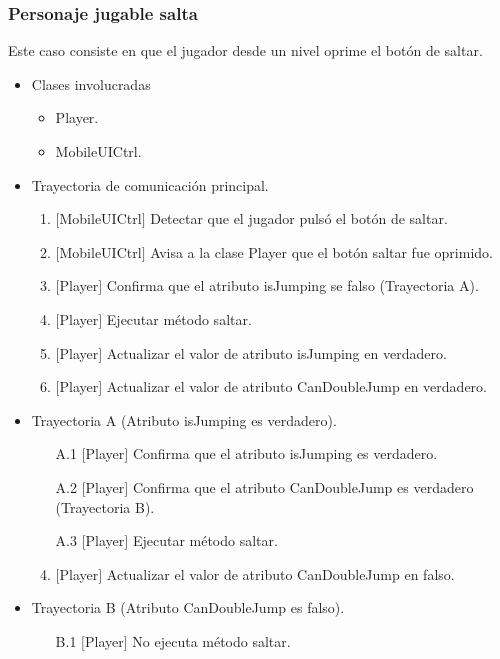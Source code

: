 	\subsubsection{Personaje jugable salta}
	Este caso consiste en que el jugador desde un nivel oprime el botón de saltar.  	
	\begin{itemize}
		\item Clases involucradas
			\begin{itemize}
				\item Player.
				\item MobileUICtrl.
			\end{itemize}
			
		\item Trayectoria de comunicación principal.
		\begin{enumerate}
				\item $\lbrack$MobileUICtrl$\rbrack$ Detectar que el jugador pulsó el 
				botón de saltar.
				\item $\lbrack$MobileUICtrl$\rbrack$ Avisa a la clase Player que el botón 
				saltar fue oprimido.
				\item $\lbrack$Player$\rbrack$ Confirma que el atributo isJumping se 
				falso (Trayectoria A).
				\item $\lbrack$Player$\rbrack$ Ejecutar método saltar.
				\item $\lbrack$Player$\rbrack$ Actualizar el valor de atributo isJumping
				en verdadero. 
				\item $\lbrack$Player$\rbrack$ Actualizar el valor de atributo CanDoubleJump 
				en verdadero.
		\end{enumerate}
		
		\item Trayectoria A (Atributo isJumping es verdadero).
			\begin{enumerate}
				\item[{A.}1] $\lbrack$Player$\rbrack$ Confirma que el atributo isJumping es 
				verdadero.
				\item[{A.}2] $\lbrack$Player$\rbrack$ Confirma que el atributo CanDoubleJump 
				es verdadero (Trayectoria B).
				\item[{A.}3] $\lbrack$Player$\rbrack$ Ejecutar método saltar.
				\item $\lbrack$Player$\rbrack$ Actualizar el valor de atributo CanDoubleJump 
				en falso.
			\end{enumerate}
			
		\item Trayectoria B (Atributo CanDoubleJump es falso).
			\begin{enumerate}
				\item[{B.}1] $\lbrack$Player$\rbrack$ No ejecuta método saltar.
			\end{enumerate}
	\end{itemize}
